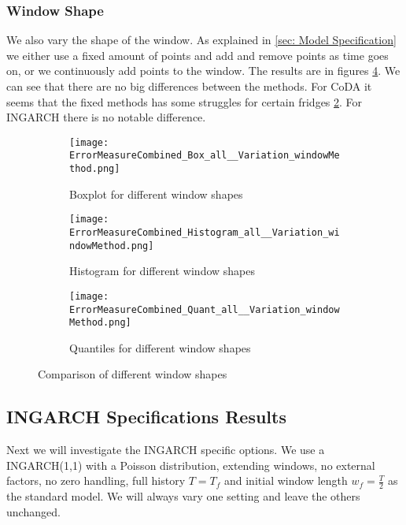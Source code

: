 \subsubsection{Window Shape}
\label{sec:Window Shape}

We also vary the shape of the window. As explained in \ref{sec: Model Specification} we either use a fixed amount of points and add and remove points as time goes on, or we continuously add points to the window. The results are in figures \ref{fig:window methods Comp1}. We can see that there are no big differences between the methods. For CoDA it seems that the fixed methods has some struggles for certain fridges \ref{fig:window methods Hist}. For INGARCH there is no notable difference. 

\begin{figure}[htb!]
\centering
\begin{subfigure}[b]{0.45\textwidth}
\texttt{[image: ErrorMeasureCombined\_Box\_all\_\_Variation\_windowMethod.png]}
\caption{Boxplot for different window shapes}
\label{fig:window methods Box}
\end{subfigure}
\hfill
\begin{subfigure}[b]{0.45\textwidth}
\texttt{[image: ErrorMeasureCombined\_Histogram\_all\_\_Variation\_windowMethod.png]}
\caption{Histogram for different window shapes}
\label{fig:window methods Hist}
\end{subfigure}
\hfill
\begin{subfigure}[b]{0.8\textwidth}
\texttt{[image: ErrorMeasureCombined\_Quant\_all\_\_Variation\_windowMethod.png]}
\caption{Quantiles for different window shapes}
\label{fig:window methods Quant}
\end{subfigure}
\caption{Comparison of different window shapes}
\label{fig:window methods Comp1}
\end{figure}


\subsection{INGARCH Specifications Results}
\label{sec: Ingarch Specifications Results}

Next we will investigate the INGARCH specific options. We use a INGARCH(1,1) with a Poisson distribution, extending windows, no external factors, no zero handling, full history $T=T_f$ and initial window length $w_f=\frac{T}{2}$ as the standard model. We will always vary one setting and leave the others unchanged. 

